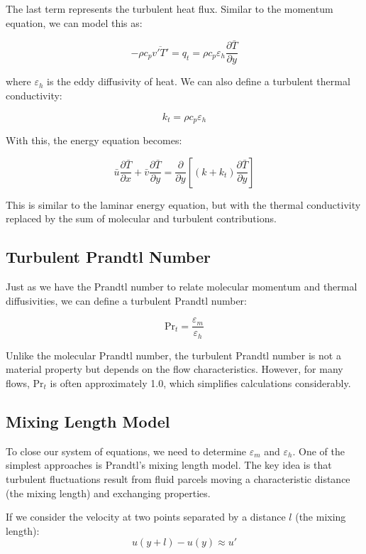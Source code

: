 The last term represents the turbulent heat flux. Similar to the momentum equation, we can model this as:

\[
-\rho c_p \overline{v'T'} = q_t = \rho c_p \varepsilon_h \frac{\partial \bar{T}}{\partial y}
\]

where $\varepsilon_h$ is the eddy diffusivity of heat. We can also define a turbulent thermal conductivity:

\[
k_t = \rho c_p \varepsilon_h
\]

With this, the energy equation becomes:

\[
\bar{u}\frac{\partial \bar{T}}{\partial x} + \bar{v}\frac{\partial \bar{T}}{\partial y} = \frac{\partial}{\partial y}\left[(k + k_t)\frac{\partial \bar{T}}{\partial y}\right]
\]

This is similar to the laminar energy equation, but with the thermal conductivity replaced by the sum of molecular and turbulent contributions.

\subsection*{Turbulent Prandtl Number}

Just as we have the Prandtl number to relate molecular momentum and thermal diffusivities, we can define a turbulent Prandtl number:

\[
\text{Pr}_t = \frac{\varepsilon_m}{\varepsilon_h}
\]

Unlike the molecular Prandtl number, the turbulent Prandtl number is not a material property but depends on the flow characteristics. However, for many flows, $\text{Pr}_t$ is often approximately 1.0, which simplifies calculations considerably.

\subsection*{Mixing Length Model}

To close our system of equations, we need to determine $\varepsilon_m$ and $\varepsilon_h$. One of the simplest approaches is Prandtl's mixing length model. The key idea is that turbulent fluctuations result from fluid parcels moving a characteristic distance (the mixing length) and exchanging properties.

If we consider the velocity at two points separated by a distance $l$ (the mixing length):
\[
u(y+l) - u(y) \approx u'
\]

